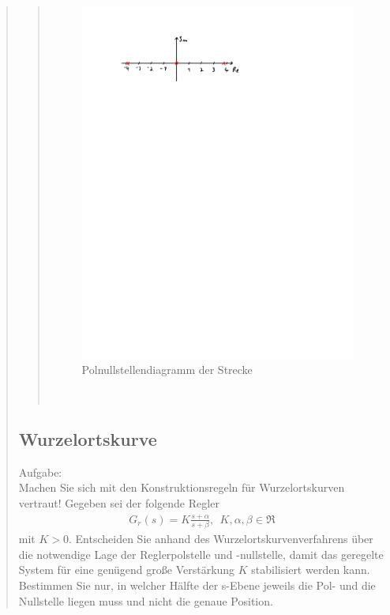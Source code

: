 \begin{quote}
\begin{quote}
        \begin{figure}[H]
        \centering
            \includegraphics[scale=1, trim = 3cm 21.5cm 9cm 2cm, clip]{Bilder/Polnullstellen_G}
                \caption{Polnullstellendiagramm der Strecke}
                \label{fig:Polnullstellen_G}
        \end{figure}
         \\ %
        
        
	\end{quote} %
	
	\subsection{Wurzelortskurve}
    Aufgabe:\\
    Machen Sie sich mit den Konstruktionsregeln für Wurzelortskurven vertraut! Gegeben sei der folgende Regler\\
    \begin{equation*}
        \begin{split}
            G_r(s) = K\frac{s + \alpha}{s + \beta}, \ \ K,\alpha, \beta \in  \Re
        \end{split}
    \end{equation*}
    mit $K > 0$. Entscheiden Sie anhand des Wurzelortskurvenverfahrens über die notwendige Lage der Reglerpolstelle
    und -nullstelle, damit das geregelte System für eine genügend große Verstärkung $K$ stabilisiert werden kann.
    Bestimmen Sie nur, in welcher Hälfte der s-Ebene jeweils die Pol- und die Nullstelle liegen muss und nicht die
    genaue Position.\\
    

\end{quote}
